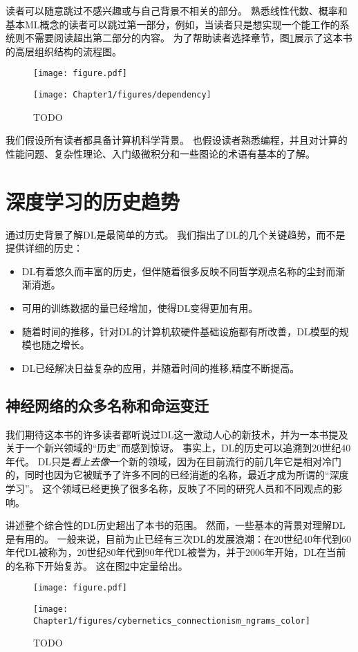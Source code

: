 读者可以随意跳过不感兴趣或与自己背景不相关的部分。
熟悉线性代数、概率和基本\gls{ML}概念的读者可以跳过第一部分，例如，当读者只是想实现一个能工作的系统则不需要阅读超出第二部分的内容。
为了帮助读者选择章节，图\ref{fig:chap1_dependency}展示了这本书的高层组织结构的流程图。
\begin{figure}[!htb]
\ifOpenSource
\centerline{\texttt{[image: figure.pdf]}}
\else
\centerline{\texttt{[image: Chapter1/figures/dependency]}}
\fi
\caption{TODO}
\label{fig:chap1_dependency}
\end{figure}


我们假设所有读者都具备计算机科学背景。
也假设读者熟悉编程，并且对计算的性能问题、复杂性理论、入门级微积分和一些图论的术语有基本的了解。

\section{深度学习的历史趋势}
\label{sec:historical_trends_in_deep_learning}
通过历史背景了解\gls{DL}是最简单的方式。
我们指出了\gls{DL}的几个关键趋势，而不是提供详细的历史：
\begin{itemize}
 \item \gls{DL}有着悠久而丰富的历史，但伴随着很多反映不同哲学观点名称的尘封而渐渐消逝。
 \item 可用的训练数据的量已经增加，使得\gls{DL}变得更加有用。
 \item 随着时间的推移，针对\gls{DL}的计算机软硬件基础设施都有所改善，\gls{DL}模型的规模也随之增长。
 \item \gls{DL}已经解决日益复杂的应用，并随着时间的推移,精度不断提高。
\end{itemize}

\subsection{神经网络的众多名称和命运变迁}
\label{sec:the_many_names_and_changing_fortunes_of_neural_networks}

我们期待这本书的许多读者都听说过\gls{DL}这一激动人心的新技术，并为一本书提及关于一个新兴领域的``历史''而感到惊讶。
事实上，\gls{DL}的历史可以追溯到20世纪40年代。
\gls{DL}只是\emph{看上去像}一个新的领域，因为在目前流行的前几年它是相对冷门的，同时也因为它被赋予了许多不同的已经消逝的名称，最近才成为所谓的``深度学习''。
这个领域已经更换了很多名称，反映了不同的研究人员和不同观点的影响。

讲述整个综合性的\gls{DL}历史超出了本书的范围。
然而，一些基本的背景对理解\gls{DL}是有用的。
一般来说，目前为止已经有三次\gls{DL}的发展浪潮：在20世纪40年代到60年代\gls{DL}被称为，20世纪80年代到90年代\gls{DL}被誉为，并于2006年开始，\gls{DL}在当前的名称下开始复苏。
这在图\ref{fig:chap1_cybernetics_connectionism_ngrams_color}中定量给出。
\begin{figure}[!htb]
\ifOpenSource
\centerline{\texttt{[image: figure.pdf]}}
\else
\centerline{\texttt{[image: Chapter1/figures/cybernetics\_connectionism\_ngrams\_color]}}
\fi
\caption{TODO}
\label{fig:chap1_cybernetics_connectionism_ngrams_color}
\end{figure}

